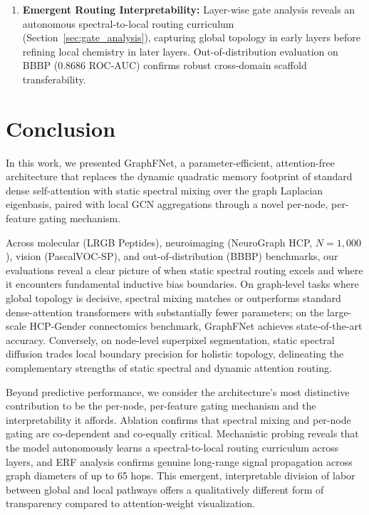 \documentclass[10pt]{article}
\begin{document}
\begin{enumerate}[leftmargin=2em]
    \item \textbf{Emergent Routing Interpretability:} Layer-wise gate analysis reveals an autonomous spectral-to-local routing curriculum (Section~\ref{sec:gate_analysis}), capturing global topology in early layers before refining local chemistry in later layers. Out-of-distribution evaluation on BBBP (0.8686 ROC-AUC) confirms robust cross-domain scaffold transferability.
\end{enumerate}

\section{Conclusion}

In this work, we presented GraphFNet, a parameter-efficient, attention-free architecture that replaces the dynamic quadratic memory footprint of standard dense self-attention with static spectral mixing over the graph Laplacian eigenbasis, paired with local GCN aggregations through a novel per-node, per-feature gating mechanism.

Across molecular (LRGB Peptides), neuroimaging (NeuroGraph HCP, $N=1{,}000$), vision (PascalVOC-SP), and out-of-distribution (BBBP) benchmarks, our evaluations reveal a clear picture of when static spectral routing excels and where it encounters fundamental inductive bias boundaries. On graph-level tasks where global topology is decisive, spectral mixing matches or outperforms standard dense-attention transformers with substantially fewer parameters; on the large-scale HCP-Gender connectomics benchmark, GraphFNet achieves state-of-the-art accuracy. Conversely, on node-level superpixel segmentation, static spectral diffusion trades local boundary precision for holistic topology, delineating the complementary strengths of static spectral and dynamic attention routing.

Beyond predictive performance, we consider the architecture's most distinctive contribution to be the per-node, per-feature gating mechanism and the interpretability it affords. Ablation confirms that spectral mixing and per-node gating are co-dependent and co-equally critical. Mechanistic probing reveals that the model autonomously learns a spectral-to-local routing curriculum across layers, and ERF analysis confirms genuine long-range signal propagation across graph diameters of up to 65 hops. This emergent, interpretable division of labor between global and local pathways offers a qualitatively different form of transparency compared to attention-weight visualization.
\end{document}
